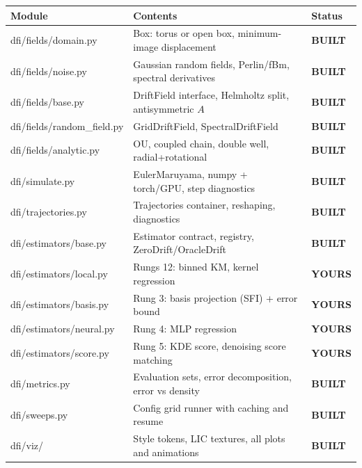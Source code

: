 \documentclass[11pt,a4paper]{article}
\newcommand{\code}[1]{{\ttfamily\small #1}}
\newcommand{\bt}[1]{{\ttfamily\footnotesize #1}}
\newcommand{\yours}{{\color{accent2}\footnotesize\bfseries YOURS}}
\newcommand{\built}{{\color{aqua}\footnotesize\bfseries BUILT}}
\begin{document}
\begin{center}
\begin{tabular}{@{}L{0.30\textwidth} L{0.55\textwidth} C{0.08\textwidth}@{}}
\toprule
\textbf{Module} & \textbf{Contents} & \textbf{Status} \\
\midrule
\bt{dfi/fields/domain.py}       & \code{Box}: torus or open box, minimum-image displacement & \built \\
\bt{dfi/fields/noise.py}        & Gaussian random fields, Perlin/fBm, spectral derivatives & \built \\
\bt{dfi/fields/base.py}         & \code{DriftField} interface, Helmholtz split, antisymmetric $A$ & \built \\
\bt{dfi/fields/random\_field.py}& \code{GridDriftField}, \code{SpectralDriftField} & \built \\
\bt{dfi/fields/analytic.py}     & OU, coupled chain, double well, radial+rotational & \built \\
\bt{dfi/simulate.py}            & Euler\textendash{}Maruyama, numpy + torch/GPU, step diagnostics & \built \\
\bt{dfi/trajectories.py}        & \code{Trajectories} container, reshaping, diagnostics & \built \\
\bt{dfi/estimators/base.py}     & Estimator contract, registry, \code{ZeroDrift}/\code{OracleDrift} & \built \\
\bt{dfi/estimators/local.py}    & Rungs 1\textendash{}2: binned KM, kernel regression & \yours \\
\bt{dfi/estimators/basis.py}    & Rung 3: basis projection (SFI) + error bound & \yours \\
\bt{dfi/estimators/neural.py}   & Rung 4: MLP regression & \yours \\
\bt{dfi/estimators/score.py}    & Rung 5: KDE score, denoising score matching & \yours \\
\bt{dfi/metrics.py}             & Evaluation sets, error decomposition, error vs density & \built \\
\bt{dfi/sweeps.py}              & Config grid runner with caching and resume & \built \\
\bt{dfi/viz/}                   & Style tokens, LIC textures, all plots and animations & \built \\
\bottomrule
\end{tabular}
\end{center}

\clearpage
\end{document}
